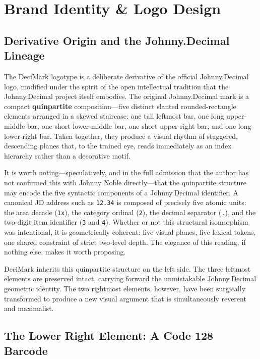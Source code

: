 \documentclass[11pt,a4paper]{book}
\begin{document}
\section{Brand Identity \& Logo Design}

\subsection{Derivative Origin and the Johnny.Decimal Lineage}

The DeciMark logotype is a deliberate derivative of the official Johnny.Decimal logo, modified under the spirit of the open intellectual tradition that the Johnny.Decimal project itself embodies. The original Johnny.Decimal mark is a compact \textbf{quinpartite} composition---five distinct slanted rounded-rectangle elements arranged in a skewed staircase: one tall leftmost bar, one long upper-middle bar, one short lower-middle bar, one short upper-right bar, and one long lower-right bar. Taken together, they produce a visual rhythm of staggered, descending planes that, to the trained eye, reads immediately as an index hierarchy rather than a decorative motif.

It is worth noting---speculatively, and in the full admission that the author has not confirmed this with Johnny Noble directly---that the quinpartite structure may encode the five syntactic components of a Johnny.Decimal identifier. A canonical JD address such as \texttt{12.34} is composed of precisely five atomic units: the area decade (\texttt{1x}), the category ordinal (\texttt{2}), the decimal separator (\texttt{.}), and the two-digit item identifier (\texttt{3} and \texttt{4}). Whether or not this structural isomorphism was intentional, it is geometrically coherent: five visual planes, five lexical tokens, one shared constraint of strict two-level depth. The elegance of this reading, if nothing else, makes it worth proposing.

DeciMark inherits this quinpartite structure on the left side. The three leftmost elements are preserved intact, carrying forward the unmistakable Johnny.Decimal geometric identity. The two rightmost elements, however, have been surgically transformed to produce a new visual argument that is simultaneously reverent and maximalist.

\subsection{The Lower Right Element: A Code 128 Barcode}
\end{document}
